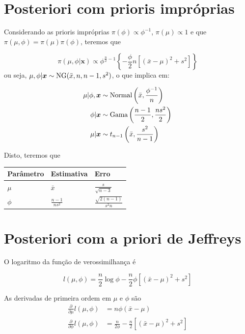 \documentclass[
  letterpaper,
  DIV=11,
  numbers=noendperiod]{scrreprt}
\theoremstyle{plain}
\theoremstyle{definition}
\theoremstyle{definition}
\theoremstyle{remark}
\begin{document}
\section{Posteriori com prioris
impróprias}\label{posteriori-com-prioris-impruxf3prias}

Considerando as prioris impróprias \(\pi(\phi)\propto \phi^{-1}\),
\(\pi(\mu)\propto 1\) e que \(\pi(\mu,\phi)=\pi(\mu)\pi(\phi)\), teremos
que

\[\pi(\mu,\phi|\boldsymbol{x})\propto \phi^{\frac{n}{2}-1}\left\{-\frac{\phi}{2}n\left[ (\bar{x}-\mu)^2 +s^2\right]\right\}\]
ou seja, \(\mu,\phi|\boldsymbol{x}\sim\hbox{NG}(\bar{x},n,n-1,s^2)\), o
que implica em:

\[\begin{align}
\mu|\phi,\boldsymbol{x}&\sim\hbox{Normal}\left(\bar{x},\frac{\phi^{-1}}{n}\right)\\
\phi|\boldsymbol{x}&\sim\hbox{Gama}\left(\frac{n-1}{2},\frac{ns^2}{2}\right)\\
\mu|\boldsymbol{x}&\sim t_{n-1}\left(\bar{x},\frac{s^2}{n-1}\right)
\end{align}\]

Disto, teremos que

\begin{longtable}[]{@{}lll@{}}
\toprule\noalign{}
Parâmetro & Estimativa & Erro \\
\midrule\noalign{}
\endhead
\bottomrule\noalign{}
\endlastfoot
\(\mu\) & \(\bar{x}\) & \(\frac{s}{\sqrt{n-3}}\) \\
\(\phi\) & \(\frac{n-1}{ns^2}\) & \(\frac{\sqrt{2(n-1)}}{s^2n}\) \\
\end{longtable}

\section{Posteriori com a priori de
Jeffreys}\label{posteriori-com-a-priori-de-jeffreys}

O logaritmo da função de verossimilhança é

\[l(\mu,\phi)=\frac{n}{2}\log\phi -\frac{n}{2}\phi\left[(\bar{x}-\mu)^2 + s^2\right]\]

As derivadas de primeira ordem em \(\mu\) e \(\phi\) são \[\begin{align}
\frac{\partial}{\partial \mu}l(\mu,\phi)&=n\phi(\bar{x}-\mu)\\
\frac{\partial}{\partial \phi}l(\mu,\phi)&=\frac{n}{2\phi}-\frac{n}{2}\left[(\bar{x}-\mu)^2 + s^2\right]\\
\end{align}\]
\end{document}
